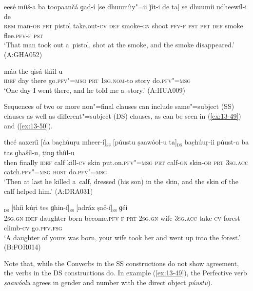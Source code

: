 \begin{exe}
\ex
\label{ex:13-47}
\gll eesé míiš-a ba toopaančá ɡaḍ-í [se dhuumíiy"=ii ǰít-i de ta] se dhuumíi uḍheewíl-i de \\
\textsc{rem} man-\textsc{ob} \textsc{prt} pistol take.out-\textsc{cv} \textsc{def}  smoke-\textsc{gn} shoot\textsc{ pfv-f} \textsc{pst} \textsc{prt} \textsc{def} smoke flee.\textsc{pfv-f} \textsc{pst} \\
\glt `That man took out a~pistol, shot at the smoke, and the smoke disappeared.' (A:GHA052)

\ex
\label{ex:13-48}
 máa-the qisá thíil-u \\
\textsc{idef} day there go.\textsc{pfv"=msg } \textsc{prt} \textsc{1sg.nom}-to story do.\textsc{pfv"=msg}  \\
\glt `One day I went there, and he told me a~story.' (A:HUA009) 
\end{exe}

Sequences of two or more non"=final clauses can include same"=subject (SS) clauses as well as different"=subject (DS) clauses, as can be seen in (\ref{ex:13-49}) and (\ref{ex:13-50}).

\begin{exe}
\ex
\label{ex:13-49}
\gll theé aaxeríi [áa bac̣húuṛu mheer-í]\textsc{\textsubscript{ss}} [púustu ṣaawóol-u ta]\textsc{\textsubscript{ds}} bac̣húuṛ-ii púust-a ba tas ɡhašíl-u, ṭinɡ thíil-u \\
then finally \textsc{idef} calf kill-\textsc{cv}  skin  put.on.\textsc{pfv"=msg} \textsc{prt} calf-\textsc{gn} skin-\textsc{ob} \textsc{prt} \textsc{3sg.acc}
catch.\textsc{pfv"=msg} \textsc{host} do.\textsc{pfv"=msg} \\
\glt `Then at last he killed a~calf, dressed (his son) in the skin, and the skin of the calf helped him.' (A:DRA031)

\ex
\label{ex:13-50}
\textsc{\textsubscript{ds}} [thíi kúṛi tes ɡhin-í]\textsc{\textsubscript{ss}} [adráx ṣač-í]\textsc{\textsubscript{ss}} ɡéi \\
\textsc{2sg.gn} \textsc{idef} daughter born become.\textsc{pfv-f} \textsc{prt} \textsc{2sg.gn}  wife \textsc{3sg.acc} take-\textsc{cv} forest climb-\textsc{cv} go.\textsc{pfv.fsg} \\
\glt `A daughter of yours was born, your wife took her and went up into the forest.' (B:FOR014) 
\end{exe}

Note that, while the Converbs in the SS constructions do not show agreement, the verbs in the DS constructions do. In example (\ref{ex:13-49}), the Perfective verb \textit{ṣaawóolu} agrees in gender and number with the direct object \textit{púustu}). 


